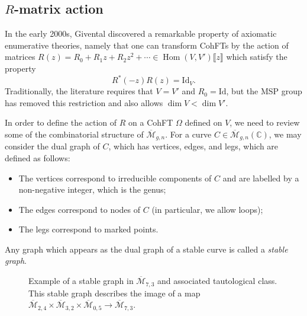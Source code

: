 \documentclass{amsart}
\theoremstyle{definition}
\theoremstyle{remark}
\theoremstyle{plain}
\theoremstyle{definition}
\theoremstyle{remark}
\newcommand{\C}{\mathbb{C}}
\newcommand{\Mbar}{\overline{\mathcal{M}}}
\newcommand{\mc}[1]{\mathcal{#1}}
\newcommand{\mr}[1]{\mathrm{#1}}
\newcommand{\ol}[1]{\overline{#1}}
\newcommand{\1}{\mathbf{1}}
\newcommand{\2}{\mathbf{2}}
\newcommand{\3}{\mathbf{3}}
\newcommand{\ps}[1]{\llbracket #1 \rrbracket}
\DeclareMathOperator{\Hom}{Hom}
\begin{document}
\subsection{$R$-matrix action}%
\label{sub:R-matrix action}

In the early 2000s, Givental discovered a remarkable property of axiomatic enumerative theories, namely that one can transform CohFTs by the action of matrices $R(z) = R_0 + R_1 z + R_2 z^2 + \cdots \in \Hom(V, V')\ps{z}$ which satisfy the property
\[ R^*(-z) R(z) = \mr{Id}_V. \]
Traditionally, the literature requires that $V = V'$ and $R_0 = \mr{Id}$, but the MSP group has removed this restriction and also allows $\dim V < \dim V'$.

In order to define the action of $R$ on a CohFT $\Omega$ defined on $V$, we need to review some of the combinatorial structure of $\Mbar_{g,n}$. For a curve $C\in \Mbar_{g,n}(\C)$, we may consider the dual graph of $C$, which has vertices, edges, and legs, which are defined as follows:
\begin{itemize}
    \item The vertices correspond to irreducible components of $C$ and are labelled by a non-negative integer, which is the genus;
    \item The edges correspond to nodes of $C$ (in particular, we allow loops);
    \item The legs correspond to marked points.
\end{itemize}
Any graph which appears as the dual graph of a stable curve is called a \textit{stable graph}.

\begin{figure}[htpb]
  \centering
  \caption{Example of a stable graph in $\ol{\mc{M}}_{7,3}$ and associated tautological class. This stable graph describes the image of a map
    $\ol{\mc{M}}_{2,4} \times \ol{\mc{M}}_{3,2} \times \ol{\mc{M}}_{0,5} \to \ol{\mc{M}}_{7,3}$.}
  \label{fig:stablegraph}
\end{figure}
\end{document}

